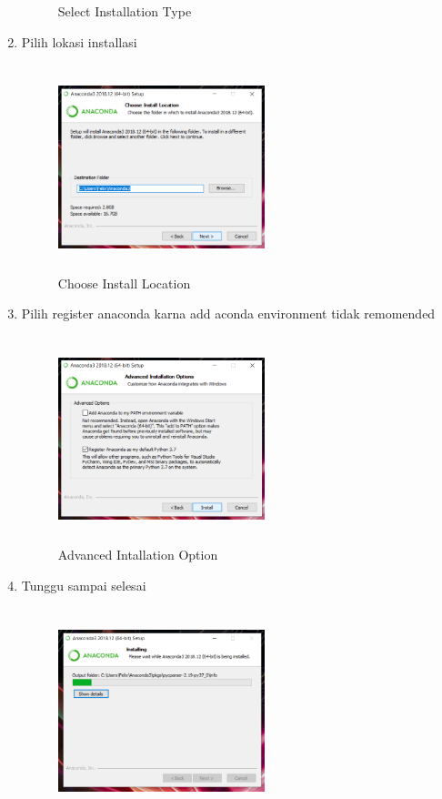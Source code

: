 \begin{enumerate}
\begin{figure}[!htbp]
        \caption{Select Installation Type}
        \label{awal}
        \end{figure}
    \item  Pilih lokasi installasi
    \begin{figure}[!htbp]
        \centering
        \includegraphics[width=6cm,height=6cm]{figures/advent/4.png}
        \caption{Choose Install Location}
        \label{awal}
        \end{figure}
    \item Pilih register anaconda karna add aconda environment tidak remomended
    \begin{figure}[!htbp]
        \centering
        \includegraphics[width=6cm,height=6cm]{figures/advent/5.png}
        \caption{Advanced Intallation Option}
        \label{awal}
        \end{figure}
    \item Tunggu sampai selesai
    \begin{figure}[!htbp]
        \centering
        \includegraphics[width=6cm,height=6cm]{figures/advent/6.png}

\end{figure}
\end{enumerate}
